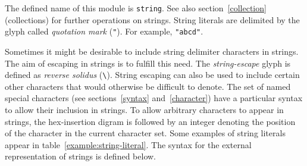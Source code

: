 \label{string}
\begin{optDefinition}
The defined name of this module is {\tt string}.  See also
section~\ref{collection} (collections) for further operations on
strings.
%
%
String literals are
delimited by the glyph called {\em quotation mark\/} (\verb+"+).  For
example, \verb+"abcd"+.

Sometimes it might be desirable to include string delimiter characters
in strings.  The aim of escaping in strings is to fulfill this need.  The {\em
string-escape\/} glyph is
defined as {\em reverse solidus\/} (\verb+\+).  String escaping can also
be used to include certain other characters that would otherwise be
difficult to denote.  The set of named special characters (see
sections~\ref{syntax} and~\ref{character}) have a particular syntax to
allow their inclusion in strings.  To allow arbitrary characters to
appear in strings, the hex-insertion digram is followed by an integer
denoting the position of the character in the current character set.
Some examples of string literals appear in
table~\ref{example:string-literal}.  The syntax for the external
representation of strings is defined below.
%
\Syntax
\label{string-syntax}
\newbox\stringSyntax
\begingroup

\def\a{\string\a}
\def\b{\string\b}
\def\d{\string\d}
\def\f{\string\f}
\def\l{\string\l}
\def\n{\string\n}
\def\r{\string\r}
\def\t{\string\t}
\def\v{\string\v}
\def\x{\string\x}
\def\'{\string\'}
\def\"{\string\"}
\def\\{\string\\}


\end{optDefinition}

